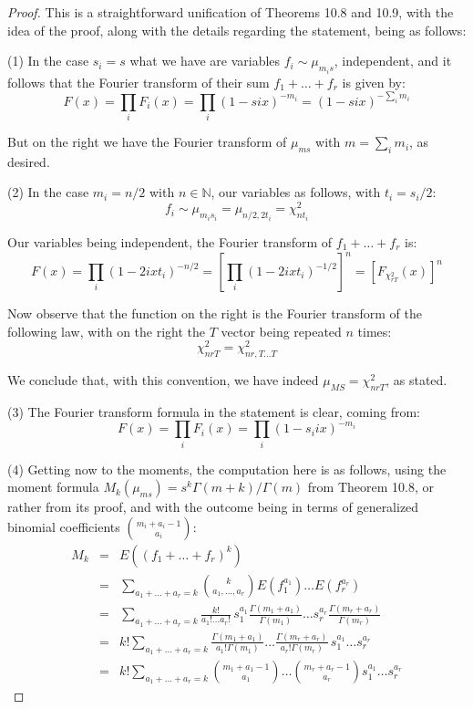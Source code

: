 \documentclass[12pt]{amsbook}
\begin{document}
\begin{proof}
This is a straightforward unification of Theorems 10.8 and 10.9, with the idea of the proof, along with the details regarding the statement, being as follows:

\medskip

(1) In the case $s_i=s$ what we have are variables $f_i\sim\mu_{m_is}$, independent, and it follows that the Fourier transform of their sum $f_1+\ldots+f_r$ is given by:
$$F(x)=\prod_iF_i(x)=\prod_i(1-six)^{-m_i}=(1-six)^{-\sum_im_i}$$

But on the right we have the Fourier transform of $\mu_{ms}$ with $m=\sum_im_i$, as desired.

\medskip

(2) In the case $m_i=n/2$ with $n\in\mathbb N$, our variables as follows, with $t_i=s_i/2$:
$$f_i\sim\mu_{m_is_i}=\mu_{n/2,2t_i}=\chi_{nt_i}^2$$

Our variables being independent, the Fourier transform of $f_1+\ldots+f_r$ is:
$$F(x)=\prod_i(1-2ixt_i)^{-n/2}=\left[\prod_i(1-2ixt_i)^{-1/2}\right]^n=\left[F_{\chi_{rT}^2}(x)\right]^n$$

Now observe that the function on the right is the Fourier transform of the following law, with on the right the $T$ vector being repeated $n$ times:
$$\chi_{nrT}^2=\chi_{nr,T\ldots T}^2$$

We conclude that, with this convention, we have indeed $\mu_{MS}=\chi_{nrT}^2$, as stated.

\medskip

(3) The Fourier transform formula in the statement is clear, coming from:
$$F(x)=\prod_iF_i(x)=\prod_i(1-s_iix)^{-m_i}$$

(4) Getting now to the moments, the computation here is as follows, using the moment formula $M_k(\mu_{ms})=s^k\Gamma(m+k)/\Gamma(m)$ from Theorem 10.8, or rather from its proof, and with the outcome being in terms of generalized binomial coefficients $\binom{m_i+a_i-1}{a_i}$:
\begin{eqnarray*}
M_k
&=&E((f_1+\ldots+f_r)^k)\\
&=&\sum_{a_1+\ldots+a_r=k}\binom{k}{a_1,\ldots,a_r}E(f_1^{a_1})\ldots E(f_r^{a_r})\\
&=&\sum_{a_1+\ldots+a_r=k}\frac{k!}{a_1!\ldots a_r!}\,s_1^{a_1}\frac{\Gamma(m_1+a_1)}{\Gamma(m_1)}\ldots s_r^{a_r}\frac{\Gamma(m_r+a_r)}{\Gamma(m_r)}\\
&=&k!\sum_{a_1+\ldots+a_r=k}\frac{\Gamma(m_1+a_1)}{a_1!\Gamma(m_1)}\ldots \frac{\Gamma(m_r+a_r)}{a_r!\Gamma(m_r)}\,s_1^{a_1}\ldots s_r^{a_r}\\
&=&k!\sum_{a_1+\ldots+a_r=k}\binom{m_1+a_1-1}{a_1}\ldots\binom{m_r+a_r-1}{a_r}s_1^{a_1}\ldots s_r^{a_r}
\end{eqnarray*}


\end{proof}
\end{document}
